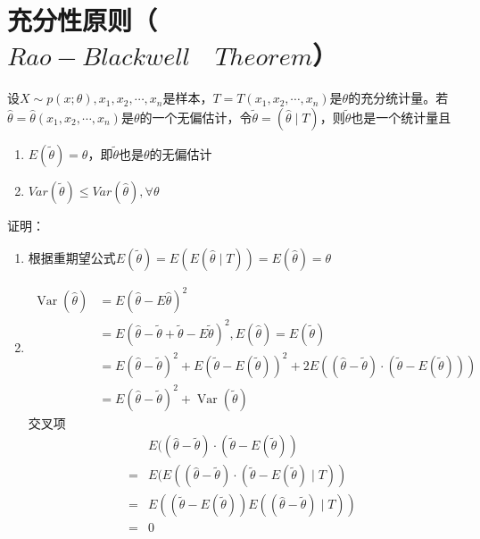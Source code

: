 \section{充分性原则（$Rao-Blackwell \quad Theorem$）}
设$X\sim p(x;\theta),x_{1},x_{2},\cdots,x_{n}$是样本，$T=T(x_{1},x_{2},\cdots,x_{n})$是$\theta$的充分统计量。若$\hat{\theta}=\hat{\theta}(x_{1},x_{2},\cdots,x_{n})$是$\theta$的一个无偏估计，令$\tilde{\theta}=(\hat{\theta}\mid T)$，则$\tilde{\theta}$也是一个统计量且
\begin{enumerate}
    \item $E(\tilde{\theta})=\theta$，即$\tilde{\theta}$也是$\theta$的无偏估计
    \item $Var(\tilde{\theta})\le Var(\hat{\theta}),\forall\theta$
\end{enumerate}
证明：
\begin{enumerate}
    \item 根据重期望公式$E(\tilde{\theta})=E(E(\hat{\theta}\mid T))=E(\hat{\theta})=\theta$
    \item $$\begin{aligned}
\operatorname{Var}(\hat{\theta}) &=E(\hat{\theta}-E \hat{\theta})^{2} \\
&=E(\hat{\theta}-\tilde{\theta}+\tilde{\theta}-E \tilde{\theta})^{2},E(\hat{\theta } )=E(\tilde{\theta }) \\
&=E(\hat{\theta}-\tilde{\theta})^{2}+E(\tilde{\theta}-E(\tilde{\theta}))^{2} +2 E((\hat{\theta}-\tilde{\theta}) \cdot(\tilde{\theta}-E(\tilde{\theta}))) \\
&=E(\hat{\theta}-\tilde{\theta})^{2}+\operatorname{Var}(\tilde{\theta})
\end{aligned}$$交叉项$$\begin{aligned}
& E((\hat{\theta}-\tilde{\theta}) \cdot(\tilde{\theta}-E(\tilde{\theta}))\\
=& E(E((\hat{\theta}-\tilde{\theta}) \cdot(\tilde{\theta}-E(\tilde{\theta}) \mid T))\\
=& E((\tilde{\theta}-E(\tilde{\theta})) E((\hat{\theta}-\tilde{\theta}) \mid T)) \\
=& 0
\end{aligned}$$
\end{enumerate}

